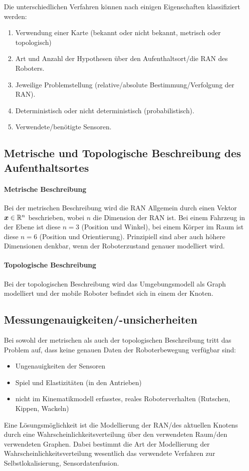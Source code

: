 		Die unterschiedlichen Verfahren können nach einigen Eigenschaften klassifiziert werden:
		\begin{enumerate}
			\item Verwendung einer Karte (bekannt oder nicht bekannt, metrisch oder topologisch)
			\item Art und Anzahl der Hypothesen über den Aufenthaltsort/die RAN des Roboters.
			\item Jeweilige Problemstellung (relative/absolute Bestimmung/Verfolgung der RAN).
			\item Deterministisch oder nicht deterministisch (probabilistisch).
			\item Verwendete/benötigte Sensoren.
		\end{enumerate}

		\subsection{Metrische und Topologische Beschreibung des Aufenthaltsortes}
			\paragraph{Metrische Beschreibung}
				Bei der metrischen Beschreibung wird die RAN Allgemein durch einen Vektor \( \bm{x} \in \mathbb{R}^n \) beschrieben, wobei \(n\) die Dimension der RAN ist. Bei einem Fahrzeug in der Ebene ist diese \( n = 3 \) (Position und Winkel), bei einem Körper im Raum ist diese \( n = 6 \) (Position und Orientierung). Prinzipiell sind aber auch höhere Dimensionen denkbar, wenn der Roboterzustand genauer modelliert wird.

			\paragraph{Topologische Beschreibung}
				Bei der topologischen Beschreibung wird das Umgebungsmodell als Graph modelliert und der mobile Roboter befindet sich in einem der Knoten.

		\subsection{Messungenauigkeiten/-unsicherheiten}
			Bei sowohl der metrischen als auch der topologischen Beschreibung tritt das Problem auf, dass keine genauen Daten der Roboterbewegung verfügbar sind:
			\begin{itemize}
				\item Ungenauigkeiten der Sensoren
				\item Spiel und Elastizitäten (\zB in den Antrieben)
				\item nicht im Kinematikmodell erfasstes, reales Roboterverhalten (\zB Rutschen, Kippen, Wackeln)
			\end{itemize}
			Eine Lösungsmöglichkeit ist die Modellierung der RAN/des aktuellen Knotens durch eine Wahrscheinlichkeitsverteilung über den verwendeten Raum/den verwendeten Graphen. Dabei bestimmt die Art der Modellierung der Wahrscheinlichkeitsverteilung wesentlich das verwendete Verfahren zur Selbstlokalisierung, \bzw Sensordatenfusion.

